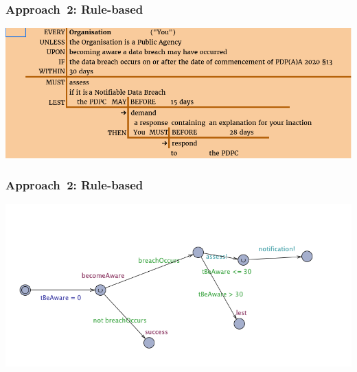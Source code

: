 \documentclass{beamer}
\begin{document}
\begin{frame}[fragile]\frametitle{Approach~2: Rule-based}

  \begin{center}
    \includegraphics[scale=0.5]{Figures/rule_sf_l4.png}
  \end{center}

\end{frame}

\begin{frame}[fragile]\frametitle{Approach~2: Rule-based}

  \begin{center}
    \includegraphics[scale=0.4]{Figures/rule_based_translation.png}
  \end{center}

\end{frame}


\end{document}
